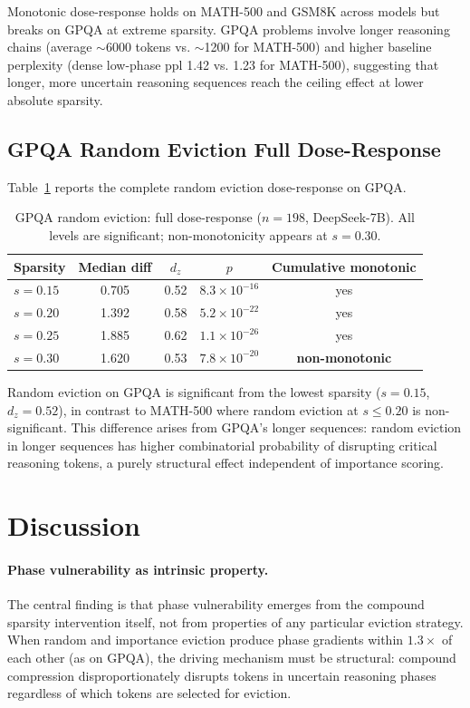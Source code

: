 \documentclass[11pt,a4paper]{article}
\begin{document}
Monotonic dose-response holds on MATH-500 and GSM8K across models but breaks on GPQA at extreme sparsity. GPQA problems involve longer reasoning chains (average $\sim$6000 tokens vs. $\sim$1200 for MATH-500) and higher baseline perplexity (dense low-phase ppl 1.42 vs. 1.23 for MATH-500), suggesting that longer, more uncertain reasoning sequences reach the ceiling effect at lower absolute sparsity.

\subsection{GPQA Random Eviction Full Dose-Response}

Table~\ref{tab:gpqa_random_full} reports the complete random eviction dose-response on GPQA.

\begin{table}[h]
\centering
\caption{GPQA random eviction: full dose-response ($n=198$, DeepSeek-7B). All levels are significant; non-monotonicity appears at $s=0.30$.}
\label{tab:gpqa_random_full}
\small
\begin{tabular}{lcccc}
\toprule
Sparsity & Median diff & $d_z$ & $p$ & Cumulative monotonic \\
\midrule
$s=0.15$ & 0.705 & 0.52 & $8.3 \times 10^{-16}$ & yes \\
$s=0.20$ & 1.392 & 0.58 & $5.2 \times 10^{-22}$ & yes \\
$s=0.25$ & 1.885 & 0.62 & $1.1 \times 10^{-26}$ & yes \\
$s=0.30$ & 1.620 & 0.53 & $7.8 \times 10^{-20}$ & \textbf{non-monotonic} \\
\bottomrule
\end{tabular}
\end{table}

Random eviction on GPQA is significant from the lowest sparsity ($s=0.15$, $d_z = 0.52$), in contrast to MATH-500 where random eviction at $s \leq 0.20$ is non-significant. This difference arises from GPQA's longer sequences: random eviction in longer sequences has higher combinatorial probability of disrupting critical reasoning tokens, a purely structural effect independent of importance scoring.

\section{Discussion}

\paragraph{Phase vulnerability as intrinsic property.}
The central finding is that phase vulnerability emerges from the compound sparsity intervention itself, not from properties of any particular eviction strategy. When random and importance eviction produce phase gradients within $1.3\times$ of each other (as on GPQA), the driving mechanism must be structural: compound compression disproportionately disrupts tokens in uncertain reasoning phases regardless of which tokens are selected for eviction.
\end{document}
